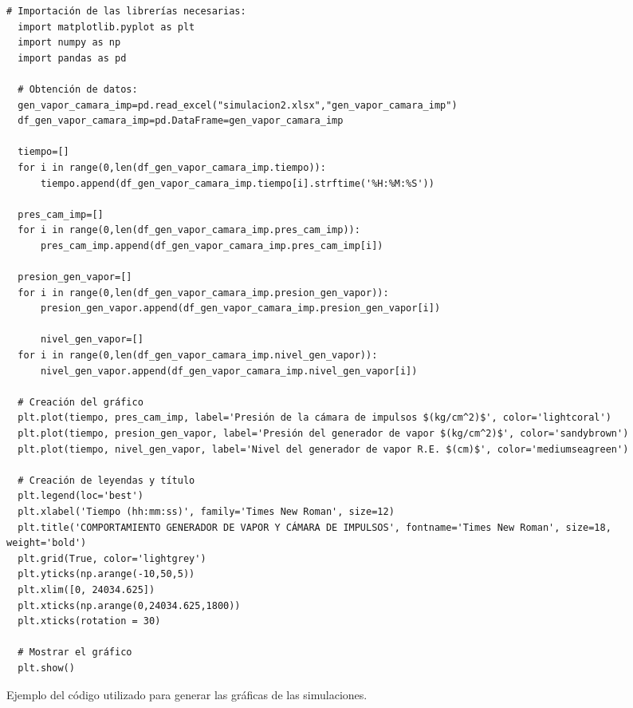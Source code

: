 \vspace{-5pt}

\begin{code}[H]
\begin{lstlisting}[firstnumber=1, breakindent=55pt]
  # Importación de las librerías necesarias:
  import matplotlib.pyplot as plt
  import numpy as np
  import pandas as pd
  
  # Obtención de datos:
  gen_vapor_camara_imp=pd.read_excel("simulacion2.xlsx","gen_vapor_camara_imp")
  df_gen_vapor_camara_imp=pd.DataFrame=gen_vapor_camara_imp
  
  tiempo=[]
  for i in range(0,len(df_gen_vapor_camara_imp.tiempo)):
      tiempo.append(df_gen_vapor_camara_imp.tiempo[i].strftime('%H:%M:%S'))
  
  pres_cam_imp=[]
  for i in range(0,len(df_gen_vapor_camara_imp.pres_cam_imp)):
      pres_cam_imp.append(df_gen_vapor_camara_imp.pres_cam_imp[i])
  
  presion_gen_vapor=[]
  for i in range(0,len(df_gen_vapor_camara_imp.presion_gen_vapor)):
      presion_gen_vapor.append(df_gen_vapor_camara_imp.presion_gen_vapor[i])
  
      nivel_gen_vapor=[]
  for i in range(0,len(df_gen_vapor_camara_imp.nivel_gen_vapor)):
      nivel_gen_vapor.append(df_gen_vapor_camara_imp.nivel_gen_vapor[i])
  
  # Creación del gráfico
  plt.plot(tiempo, pres_cam_imp, label='Presión de la cámara de impulsos $(kg/cm^2)$', color='lightcoral')
  plt.plot(tiempo, presion_gen_vapor, label='Presión del generador de vapor $(kg/cm^2)$', color='sandybrown')
  plt.plot(tiempo, nivel_gen_vapor, label='Nivel del generador de vapor R.E. $(cm)$', color='mediumseagreen')
  
  # Creación de leyendas y título
  plt.legend(loc='best')
  plt.xlabel('Tiempo (hh:mm:ss)', family='Times New Roman', size=12)
  plt.title('COMPORTAMIENTO GENERADOR DE VAPOR Y CÁMARA DE IMPULSOS', fontname='Times New Roman', size=18, weight='bold')
  plt.grid(True, color='lightgrey')
  plt.yticks(np.arange(-10,50,5))
  plt.xlim([0, 24034.625])
  plt.xticks(np.arange(0,24034.625,1800))
  plt.xticks(rotation = 30)
  
  # Mostrar el gráfico
  plt.show()
\end{lstlisting}
\vspace{-5pt}
\caption{Ejemplo del código utilizado para generar las gráficas de las simulaciones.}
\label{cod:codigo_graficas}
\end{code}


